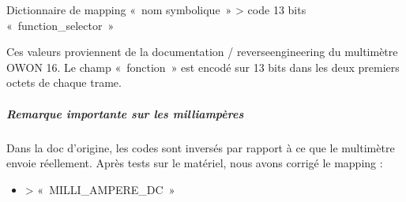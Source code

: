 \documentclass[letterpaper,10pt,french]{sphinxmanual}
\begin{document}
\begin{fulllineitems}
\label{\detokenize{api/hardware.devices:hardware.devices.owon_multimeter.OWON_FUNCTION}}
\pysigstartsignatures
\pysigline
{}
\pysigstopsignatures
\sphinxAtStartPar
Dictionnaire de mapping « nom symbolique » \sphinxhyphen{}\textgreater{} code 13 bits « function\_selector »

\sphinxAtStartPar
Ces valeurs proviennent de la documentation / reverse\sphinxhyphen{}engineering du
multimètre OWON 16. Le champ « fonction » est encodé sur 13 bits dans les
deux premiers octets de chaque trame.


\subparagraph{Remarque importante sur les milliampères}
\label{\detokenize{api/hardware.devices:remarque-importante-sur-les-milliamperes}}
\sphinxAtStartPar
Dans la doc d’origine, les codes  sont
inversés par rapport à ce que le multimètre envoie réellement.
Après tests sur le matériel, nous avons corrigé le mapping :
\begin{itemize}
\item {} 
  \sphinxhyphen{}\textgreater{} « MILLI\_AMPERE\_DC »


\end{itemize}
\end{fulllineitems}
\end{document}
